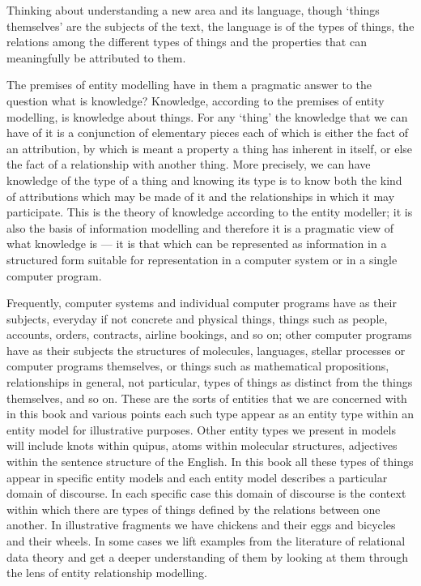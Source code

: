 Thinking about understanding a new area and its language, though ‘things themselves’ are the subjects of the text, the language is of the types of things, the relations among the different types of things and the properties that can meaningfully be attributed to them. 

The premises of entity modelling have in them a pragmatic answer to the question what is knowledge? Knowledge, according to the premises of entity modelling, is knowledge about things. For any ‘thing’ the knowledge that we can have of it is a conjunction of elementary pieces each of which is either the fact of an attribution, by which is meant a property a thing has inherent in itself, or else the fact of a relationship with another thing. More precisely, we can have knowledge of the type of a thing and knowing its type is to know both the kind of attributions which may be made of it and the relationships in which it may participate. This is the theory of knowledge according to the entity modeller; it is also the basis of information modelling and therefore it is a pragmatic view of what knowledge is — it is that which can be represented as information in a structured form suitable for representation in a computer system or in a single computer program.

Frequently, computer systems and individual computer programs have as their subjects, everyday if not concrete and physical things, things such as people, accounts, orders, contracts, airline bookings, and so on; other computer programs have as their subjects the structures of molecules, languages, stellar processes or computer programs themselves, or things such as mathematical propositions, relationships in general, not particular, types of things as distinct from the things themselves, and so on. These are the sorts of entities that we are concerned with in this book and various points each such type appear as an entity type within an entity model for illustrative purposes. Other entity types we present in models will include knots within quipus, atoms within molecular structures, adjectives within the sentence structure of the English. In this book all these types of things appear in specific entity models and each entity model describes a particular domain of discourse. 
In each specific case this domain of discourse is the context within which there are types of things defined by the relations between one another. In illustrative fragments we have chickens and their eggs and bicycles and their wheels. 
In some cases we lift examples from the literature of relational data theory and get a deeper understanding
of them by looking at them through the lens of entity relationship modelling.



